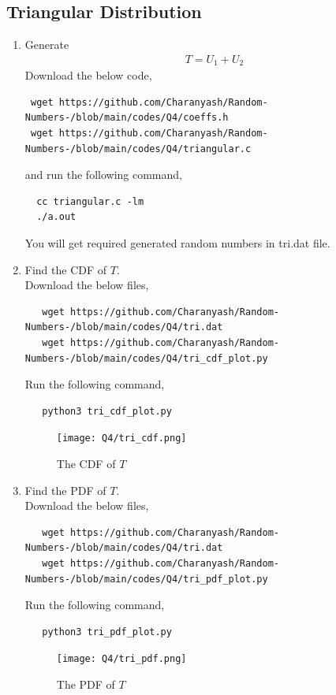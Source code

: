 \documentclass[journal,12pt,twocolumn]{IEEEtran}
\renewcommand\thesection{\arabic{section}}
\begin{document}
\begin{enumerate}[label=\thesection.\arabic*,ref=\thesection.\theenumi]
 \section{Triangular Distribution}
\begin{enumerate}[label=\thesection.\arabic*
,ref=\thesection.\theenumi]
%
\item Generate
	\begin{align}
		T = U_1+U_2
	\end{align}
\solution Download the below code,
 \begin{lstlisting}
 wget https://github.com/Charanyash/Random-Numbers-/blob/main/codes/Q4/coeffs.h
 wget https://github.com/Charanyash/Random-Numbers-/blob/main/codes/Q4/triangular.c
 \end{lstlisting}
and run the following command,
 \begin{lstlisting}
  cc triangular.c -lm
  ./a.out
 \end{lstlisting}
 You will get required generated random numbers in tri.dat file.		
\item Find the CDF of $T$.\\
 \solution Download the below files,
  \begin{lstlisting}
   wget https://github.com/Charanyash/Random-Numbers-/blob/main/codes/Q4/tri.dat
   wget https://github.com/Charanyash/Random-Numbers-/blob/main/codes/Q4/tri_cdf_plot.py
  \end{lstlisting}
  Run the following command,
  \begin{lstlisting}
   python3 tri_cdf_plot.py
  \end{lstlisting}
  \begin{figure}
   \centering
   \texttt{[image: Q4/tri\_cdf.png]}
   \caption{The CDF of $T$}
   \label{fig:tri_cdf}
  \end{figure}
\item Find the PDF of $T$.\\
 \solution Download the below files,
  \begin{lstlisting}
   wget https://github.com/Charanyash/Random-Numbers-/blob/main/codes/Q4/tri.dat
   wget https://github.com/Charanyash/Random-Numbers-/blob/main/codes/Q4/tri_pdf_plot.py
  \end{lstlisting}
  Run the following command,
  \begin{lstlisting}
   python3 tri_pdf_plot.py
  \end{lstlisting}		
 \begin{figure}
  \centering
  \texttt{[image: Q4/tri\_pdf.png]}
  \caption{The PDF of $T$}

\end{figure}
\end{enumerate}
\end{enumerate}
\end{document}
